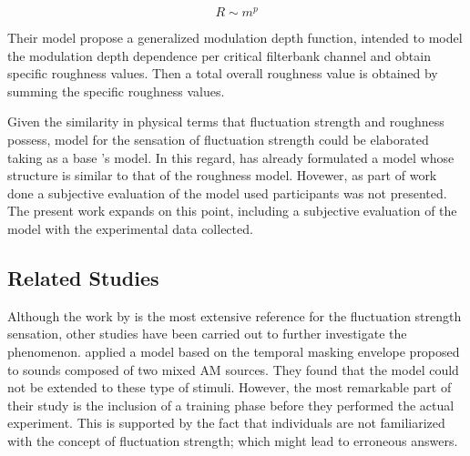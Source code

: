\documentclass[../main.tex]{subfiles}
\begin{document}
\begin{theoreticalbackground}
\begin{equation}
  R \sim m^p
  \label{eq:R}
\end{equation}

Their model propose a generalized modulation depth function, intended to model
the modulation depth dependence per critical filterbank channel and obtain
specific roughness values. Then a total overall roughness value is obtained by
summing the specific roughness values.

Given the similarity in physical terms that fluctuation strength and roughness
possess,  model for the sensation of fluctuation strength could be elaborated
taking as a base \citeauthor{daniel1997psychoacoustical}'s model. In this
regard, \textcite{Sontacchi1998} has already formulated a model whose structure
is similar to that of the roughness model. Hovewer, as part of work done a
subjective evaluation of the model used participants was not presented. The
present work expands on this point, including a subjective evaluation of the
model with the experimental data collected.

\subsection{Related Studies}

Although the work by \citeauthor{Fastl2007Psychoacoustics} is the most extensive
reference for the fluctuation strength sensation, other studies have been
carried out to further investigate the phenomenon.
\textcite{Accolti2009Fluctuation} applied a model based on the temporal masking
envelope proposed to sounds composed of two mixed \gls{AM} sources. They found
that the model could not be extended to these type of stimuli. However, the most
remarkable part of their study is the inclusion of a training phase before they
performed the actual experiment. This is supported by the fact that individuals
are not familiarized with the concept of fluctuation strength; which might lead
to erroneous answers.


\end{theoreticalbackground}
\end{document}
